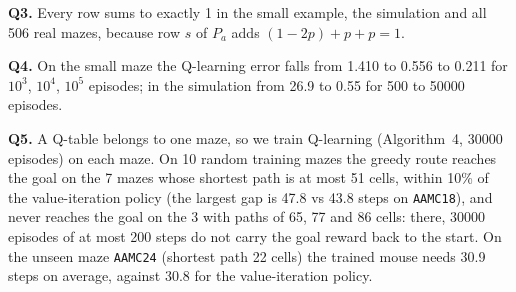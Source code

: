 \noindent\textbf{Q3.} Every row sums to exactly 1 in the small example, the simulation and all 506 real mazes, because row $s$ of $P_a$ adds $(1-2p)+p+p = 1$.
\signoff{\DS}{\GK}

\noindent\textbf{Q4.} On the small maze the Q-learning error falls from 1.410 to 0.556 to 0.211 for $10^3$, $10^4$, $10^5$ episodes; in the simulation from 26.9 to 0.55 for 500 to 50000 episodes.
\signoff{\DS}{\GK}

\noindent\textbf{Q5.} A Q-table belongs to one maze, so we train Q-learning (Algorithm~4, 30000 episodes) on each maze. On 10 random training mazes the greedy route reaches the goal on the 7 mazes whose shortest path is at most 51 cells, within 10\% of the value-iteration policy (the largest gap is 47.8 vs 43.8 steps on \texttt{AAMC18}), and never reaches the goal on the 3 with paths of 65, 77 and 86 cells: there, 30000 episodes of at most 200 steps do not carry the goal reward back to the start. On the unseen maze \texttt{AAMC24} (shortest path 22 cells) the trained mouse needs 30.9 steps on average, against 30.8 for the value-iteration policy.
\signoff{\DS}{\GK}

